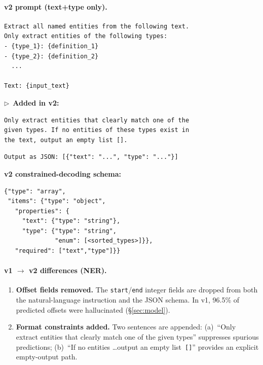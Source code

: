 \paragraph{v2 prompt (text+type only).}

\begin{small}
\begin{lstlisting}
Extract all named entities from the following text.
Only extract entities of the following types:
- {type_1}: {definition_1}
- {type_2}: {definition_2}
  ...

Text: {input_text}
\end{lstlisting}
\end{small}
\vspace{-0.5em}
\noindent$\triangleright$~\textbf{Added in v2:}
\begin{small}
\begin{lstlisting}
Only extract entities that clearly match one of the
given types. If no entities of these types exist in
the text, output an empty list [].
\end{lstlisting}
\end{small}
\vspace{-0.5em}
\begin{small}
\begin{lstlisting}
Output as JSON: [{"text": "...", "type": "..."}]
\end{lstlisting}
\end{small}

\noindent
\textbf{v2 constrained-decoding schema:}
\begin{small}
\begin{lstlisting}
{"type": "array",
 "items": {"type": "object",
   "properties": {
     "text": {"type": "string"},
     "type": {"type": "string",
              "enum": [<sorted_types>]}},
   "required": ["text","type"]}}
\end{lstlisting}
\end{small}

\paragraph{v1 $\to$ v2 differences (NER).}
\begin{enumerate}[leftmargin=*,itemsep=2pt]
\item \textbf{Offset fields removed.} The \texttt{start}/\texttt{end} integer fields are dropped from both the natural-language instruction and the JSON schema. In v1, 96.5\% of predicted offsets were hallucinated (\S\ref{sec:model}).
\item \textbf{Format constraints added.} Two sentences are appended: (a)~``Only extract entities that clearly match one of the given types'' suppresses spurious predictions; (b)~``If no entities \ldots output an empty list~\texttt{[]}'' provides an explicit empty-output path.
\end{enumerate}

